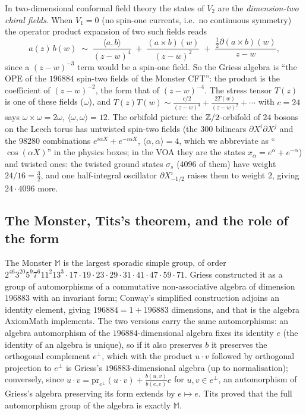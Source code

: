 \begin{physics}
In two-dimensional conformal field theory the states of $V_2$ are the \emph{dimension-two chiral
fields}.  When $V_1=0$ (no spin-one currents, i.e.\ no continuous symmetry) the operator product
expansion of two such fields reads
\begin{equation*}
  a(z)\,b(w)\;\sim\;\frac{\langle a,b\rangle}{(z-w)^4}\;+\;\frac{(a\times b)(w)}{(z-w)^2}
  \;+\;\frac{\tfrac12\partial(a\times b)(w)}{z-w},
\end{equation*}
since a $(z-w)^{-3}$ term would be a spin-one field.  So the Griess algebra is ``the OPE of the
$196884$ spin-two fields of the Monster CFT'': the product is the coefficient of $(z-w)^{-2}$, the form
that of $(z-w)^{-4}$.  The stress tensor $T(z)$ is one of these fields ($\omega$), and
$T(z)T(w)\sim\frac{c/2}{(z-w)^4}+\frac{2T(w)}{(z-w)^2}+\cdots$ with $c=24$ says $\omega\times\omega=2\omega$,
$\langle\omega,\omega\rangle=12$.  The orbifold picture: the ${\mathbb{Z}}/2$-orbifold of $24$ bosons on the Leech
torus has untwisted spin-two fields (the $300$ bilinears $\partial X^i\partial X^j$ and the $98280$
combinations $e^{i\alpha X}+e^{-i\alpha X}$, $\langle\alpha,\alpha\rangle=4$, which we abbreviate as
``$\cos(\alpha X)$'' in the physics boxes; in the VOA they are the states $x_\alpha=e^\alpha+e^{-\alpha}$) and
twisted ones: the twisted
ground states $\sigma_s$ ($4096$ of them) have weight $24/16=\tfrac32$, and one half-integral oscillator
$\partial X^i_{-1/2}$ raises them to weight $2$, giving $24\cdot4096$ more.
\end{physics}

\subsection{The Monster, Tits's theorem, and the role of the form}\label{ch21:sec:tits}

The Monster $\mathbb M$ is the largest sporadic simple group, of order
$2^{46}3^{20}5^{9}7^{6}11^2 13^3\cdot17\cdot19\cdot23\cdot29\cdot31\cdot41\cdot47\cdot59\cdot71$.  Griess
constructed it as a group of automorphisms of a commutative non-associative algebra of dimension
$196883$ with an invariant form; Conway's simplified construction adjoins an identity element, giving
$196884=1+196883$ dimensions, and that is the algebra AxiomMath implements.  The two versions carry the
same automorphisms: an algebra automorphism of the $196884$-dimensional algebra fixes its identity $e$
(the identity of an algebra is unique), so if it also preserves $b$ it preserves the orthogonal
complement $e^\perp$, which with the product $u\cdot v$ followed by orthogonal projection to $e^\perp$ is
Griess's $196883$-dimensional algebra (up to normalisation); conversely, since
$u\cdot v=\mathrm{pr}_{e^\perp}(u\cdot v)+\tfrac{b(u,v)}{b(e,e)}e$ for $u,v\in e^\perp$, an automorphism of
Griess's algebra preserving its form extends by $e\mapsto e$.  Tits proved that the full
automorphism group of the algebra is exactly $\mathbb M$.

